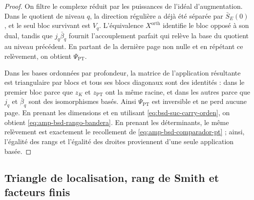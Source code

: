 \begin{proof}
On filtre le complexe réduit par les puissances de l'idéal d'augmentation. Dans le
quotient de niveau \(q\), la direction régulière a déjà été séparée par
\(\bar S_E(0)\), et le seul bloc survivant est \(V_q\). L'équivalence
\(X^{\mathrm{orth}}\) identifie le bloc opposé à son dual, tandis que
\(j_q\bar\beta_q\) fournit l'accouplement parfait qui relève la
base du quotient au niveau précédent. En partant de la dernière page non nulle et
en répétant ce relèvement, on obtient \(\Psi_{\mathrm{PT}}\).

Dans les bases ordonnées par profondeur, la matrice de l'application résultante est
triangulaire par blocs et tous ses blocs diagonaux sont des identités : dans le
premier bloc parce que \(z_K\) et \(z_{\mathrm{PT}}\) ont la même racine, et
dans les autres parce que \(j_q\) et \(\bar\beta_q\) sont des isomorphismes basés.
Ainsi \(\Psi_{\mathrm{PT}}\) est inversible et ne perd aucune page.
En prenant les dimensions et en utilisant
\eqref{eq:bsd-suc-carry-orden}, on obtient
\eqref{eq:amp-bsd-rango-bandera}. En prenant les déterminants, le même
relèvement est exactement le recollement de
\eqref{eq:amp-bsd-comparador-pt} ; ainsi, l'égalité des rangs et l'égalité des
droites proviennent d'une seule application basée.
\end{proof}

\subsection{Triangle de localisation, rang de Smith et facteurs finis}
\label{subsec:amp-bsd-smith-sha}

